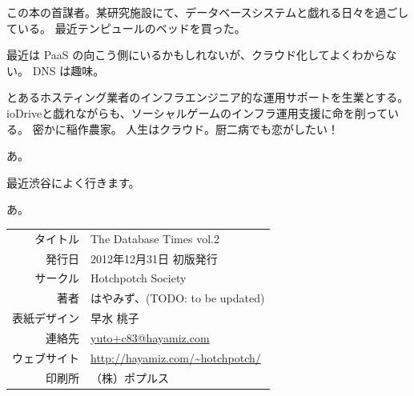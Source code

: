 \documentclass[b5paper,papersize,tombow,10pt]{jsbook}
\begin{document}
 \quad
この本の首謀者。某研究施設にて、データベースシステムと戯れる日々を過ごしている。
最近テンピュールのベッドを買った。

 \quad
最近は PaaS の向こう側にいるかもしれないが、クラウド化してよくわからない。
DNS は趣味。

 \quad
とあるホスティング業者のインフラエンジニア的な運用サポートを生業とする。
ioDriveと戯れながらも、ソーシャルゲームのインフラ運用支援に命を削っている。
密かに稲作農家。
人生はクラウド。厨二病でも恋がしたい！

 \quad
あ。

 \quad
最近渋谷によく行きます。

 \quad
あ。


\vspace*{15\Cvs}

\begin{center}
 \par\vspace*{1mm}
 \begin{tabular}{rl}
  \hline
  タイトル & The Database Times vol.2 \\
  発行日 & 2012年12月31日 初版発行 \\
  サークル & Hotchpotch Society \\
  著者 & はやみず、(TODO: to be updated) \\
  表紙デザイン & 早水 桃子 \\
  連絡先 & \url{yuto+c83@hayamiz.com} \\
  ウェブサイト & \url{http://hayamiz.com/~hotchpotch/} \\
  印刷所 & （株）ポプルス \\
  \hline
 \end{tabular}
\end{center}
\end{document}
